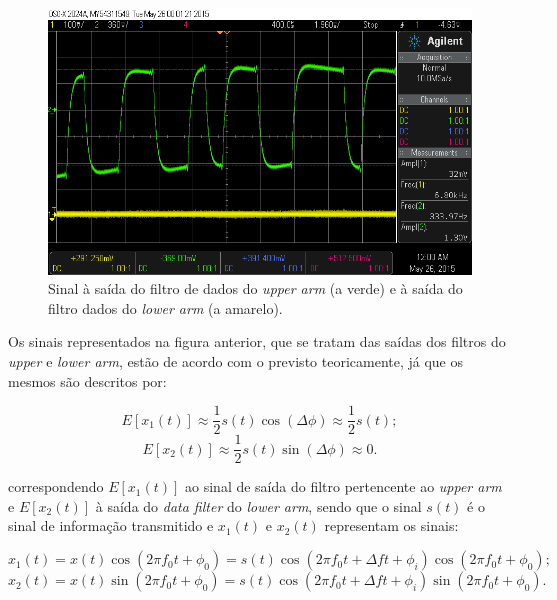 \documentclass[11pt]{article}
\numberwithin{equation}{section}
\begin{document}
\begin{figure}[H]
	\centering
	\includegraphics[keepaspectratio=true, scale=0.37]{exps/upperandlowerarm}
	\caption{Sinal à saída do filtro de dados do \textit{upper arm} (a verde) e à saída do filtro dados do \textit{lower arm} (a amarelo).}
	\vspace{-0.8em}
\end{figure}

Os sinais representados na figura anterior, que se tratam das saídas dos filtros do \textit{upper} e \textit{lower arm}, estão de acordo com o previsto teoricamente, já que os mesmos são descritos por:

\vspace{-3mm}
\begin{equation}
	E[x_1(t)] \approx \frac{1}{2} s(t) \cos(\Delta \phi) \approx \frac{1}{2}s(t);
\end{equation} 
\vspace{-1mm}
\begin{equation}
E[x_2(t)] \approx \frac{1}{2} s(t) \sin(\Delta \phi) \approx 0.
\end{equation} 

correspondendo $E[x_1(t)]$ ao sinal de saída do filtro pertencente ao \textit{upper arm} e $E[x_2(t)]$ à saída do \textit{data filter} do \textit{lower arm}, sendo que o sinal $s(t)$ é o sinal de informação transmitido e $x_1(t)$ e $x_2(t)$  representam os sinais:

\vspace{-3mm}
\begin{equation}
x_1(t) = x(t)\cos(2\pi f_0t + \phi_0) = s(t)\cos(2\pi f_0t + \Delta ft + \phi_i)\cos(2\pi f_0t + \phi_0);
\end{equation}
\vspace{-4mm}
\begin{equation}
 x_2(t) = x(t)\sin(2\pi
 f_0t + \phi_0) = s(t)\cos(2\pi f_0t + \Delta ft + \phi_i)\sin(2\pi
 f_0t + \phi_0).
\end{equation}
\end{document}
